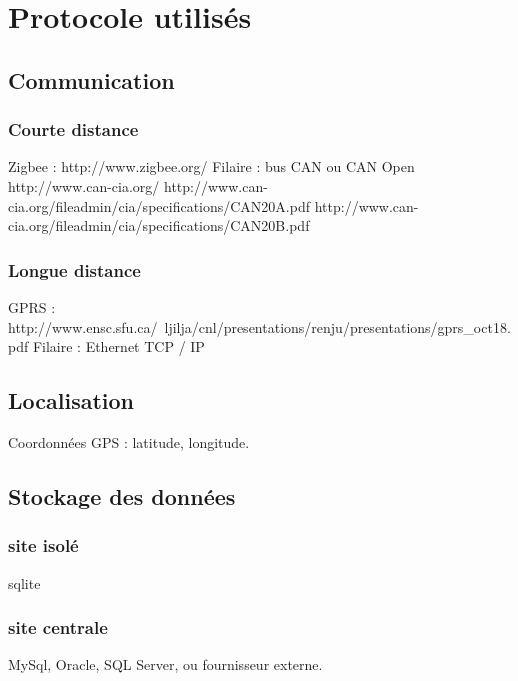 \section{Protocole utilisés}

    \subsection{Communication}
    
        \subsubsection{Courte distance}
            Zigbee : http://www.zigbee.org/
            Filaire : bus CAN ou CAN Open
                http://www.can-cia.org/
                http://www.can-cia.org/fileadmin/cia/specifications/CAN20A.pdf
                http://www.can-cia.org/fileadmin/cia/specifications/CAN20B.pdf
        
        \subsubsection{Longue distance}
            GPRS : http://www.ensc.sfu.ca/~ljilja/cnl/presentations/renju/presentations/gprs_oct18.pdf
            Filaire : Ethernet TCP / IP
            
        
    \subsection{Localisation}
    
        Coordonnées GPS : latitude, longitude.
    
    \subsection{Stockage des données}
    
        \subsubsection{site isolé}
            sqlite
        
        \subsubsection{site centrale}
            MySql, Oracle, SQL Server, ou fournisseur externe.
